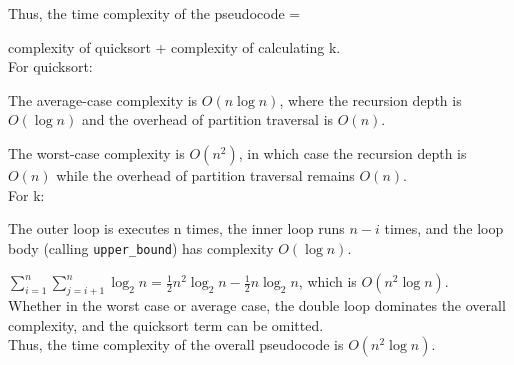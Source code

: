 \noindent Thus, the time complexity of the pseudocode =

complexity of quicksort + complexity of calculating k.
\\ 

\noindent For quicksort:

The average-case complexity is $O(n\log n)$, 
where the recursion depth is $O(\log n)$ and the overhead of partition traversal is $O(n)$.

The worst-case complexity is $O(n^2)$, 
in which case the recursion depth is $O(n)$ while the overhead of partition traversal remains $O(n)$.
\\

\noindent For k:

The outer loop is executes n times, the inner loop runs $n-i$ times, and the loop body (calling \texttt{upper\_bound}) has complexity $O(\log n)$.

$ \sum_{i=  1}^{n}\sum_{j=  i+1}^{n}\log_2 n=  \frac{1}{2}n^2 \log_2 n- \frac{1}{2}n \log_2 n$, which is $O(n^2 \log n)$.
\\

\noindent Whether in the worst case or average case, the double loop dominates the overall complexity, and the quicksort term can be omitted.
\\

\noindent Thus, the time complexity of the overall pseudocode is $O(n^2 \log n)$.
\newpage
